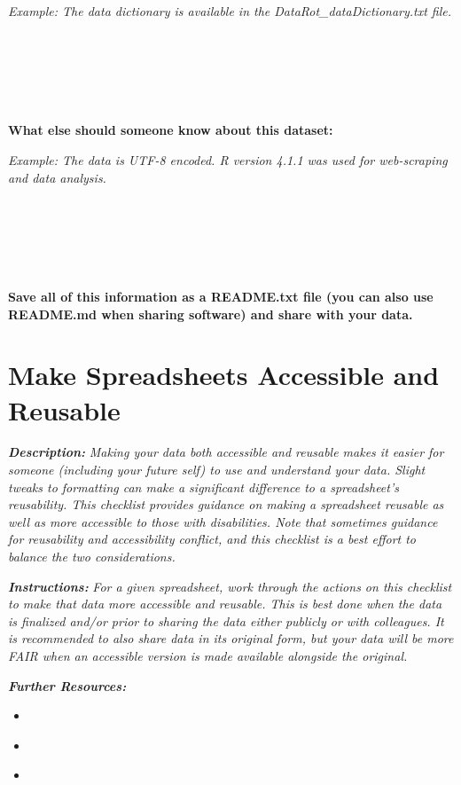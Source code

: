 \documentclass[
]{book}
\providecommand{\tightlist}{%
  \setlength{\itemsep}{0pt}\setlength{\parskip}{0pt}}
\begin{document}
\emph{Example: The data dictionary is available in the DataRot\_dataDictionary.txt file.}

~

~

~

\textbf{What else should someone know about this dataset:}

\emph{Example: The data is UTF-8 encoded. R version 4.1.1 was used for web-scraping and data analysis.}

~

~

~

\textbf{Save all of this information as a README.txt file (you can also use README.md when sharing software) and share with your data.}

\hypertarget{accessible-spreadsheets}{%
\section{Make Spreadsheets Accessible and Reusable}\label{accessible-spreadsheets}}

\textbf{\emph{Description:}} \emph{Making your data both accessible and reusable makes it easier for someone (including your future self) to use and understand your data. Slight tweaks to formatting can make a significant difference to a spreadsheet's reusability. This checklist provides guidance on making a spreadsheet reusable as well as more accessible to those with disabilities. Note that sometimes guidance for reusability and accessibility conflict, and this checklist is a best effort to balance the two considerations.}

\textbf{\emph{Instructions:}} \emph{For a given spreadsheet, work through the actions on this checklist to make that data more accessible and reusable. This is best done when the data is finalized and/or prior to sharing the data either publicly or with colleagues. It is recommended to also share data in its original form, but your data will be more FAIR \citep{wilkinson_fair_2016} when an accessible version is made available alongside the original.}

\textbf{\emph{Further Resources:}}

\begin{itemize}
\tightlist
\item
  \citep{broman_data_2018}
\item
  \citep{oxford_accessibility_2023}
\item
  \citep{wickham_tidy_2014}
\end{itemize}
\end{document}

